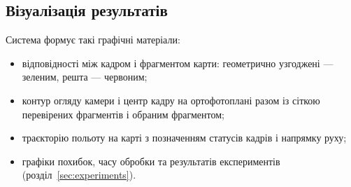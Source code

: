\subsection{Візуалізація результатів}

Система формує такі графічні матеріали:
\begin{itemize}
    \item відповідності між кадром і фрагментом карти: геометрично узгоджені --- зеленим, решта --- червоним;
    \item контур огляду камери і центр кадру на ортофотоплані разом із сіткою перевірених фрагментів і обраним фрагментом;
    \item траєкторію польоту на карті з позначенням статусів кадрів і напрямку руху;
    \item графіки похибок, часу обробки та результатів експериментів (розділ~\ref{sec:experiments}).
\end{itemize}
